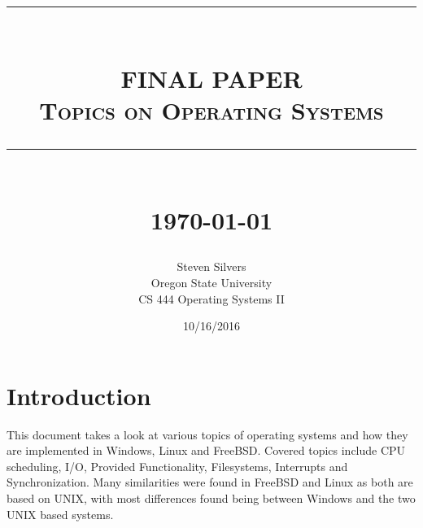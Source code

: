 \documentclass[10pt,serif,draftclsnofoot,onecolumn]{IEEEtran}
\newcommand{\HRule}[1]{\rule{\linewidth}{#1}}
\begin{document}
	\begin{titlepage}


	\title{ \normalsize \textsc{}
			\\ [2.0cm]
			\HRule{0.5pt} \\
			\LARGE \textbf{\uppercase{Final Paper}}
			\\ \normalsize \textsc{Topics on Operating Systems}
			\HRule{2pt} \\ [0.5cm]
			\normalsize \today \vspace*{5\baselineskip}}
	\date{10/16/2016}
	
	\author{Steven Silvers \\
			Oregon State University \\
			CS 444 Operating Systems II}
	\maketitle
	\end{titlepage}
	\newpage
	\tableofcontents
	\newpage
\section{Introduction}
	\par	
	This document takes a look at various topics of operating systems and how they are implemented in Windows, Linux and FreeBSD. Covered topics include CPU scheduling, I/O, Provided Functionality, Filesystems, Interrupts and Synchronization. Many similarities were found in FreeBSD and Linux as both are based on UNIX, with most differences found being between Windows and the two UNIX based systems.
	
\end{document}
